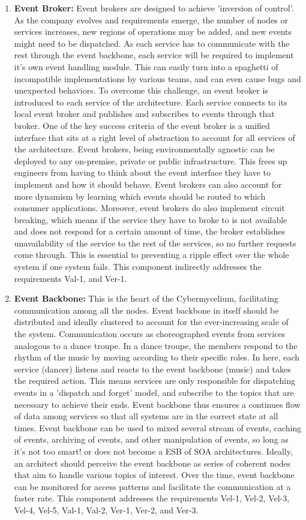 \documentclass[review]{elsarticle}
\begin{document}
\begin{enumerate}
    \item \textbf{Event Broker:} Event brokers are designed to achieve 'inversion of control'. As the company evolves and requirements emerge, the number of nodes or services increases, new regions of operations may be added, and new events might need to be dispatched. As each service has to communicate with the rest through the event backbone, each service will be required to implement it's own event handling module. This can easily turn into a spaghetti of incompatible implementations by various teams, and can even cause bugs and unexpected behaviors. To overcome this challenge, an event broker is introduced to each service of the architecture. Each service connects to its local event broker and publishes and subscribes to events through that broker. One of the key success criteria of the event broker is a unified interface that sits at a right level of abstraction to account for all services of the architecture. Event brokers, being environmentally agnostic can be deployed to any on-premise, private or public infrastructure. This frees up engineers from having to think about the event interface they have to implement and how it should behave. Event brokers can also account for more dynamism by learning which events should be routed to which consumer applications.  Moreover, event brokers do also implement circuit breaking, which means if the service they have to broke to is not available and does not respond for a certain amount of time, the broker establishes unavailability of the service to the rest of the services, so no further requests come through. This is essential to preventing a ripple effect over the whole system if one system fails. This component indirectly addresses the
    requirements Val-1, and Ver-1.
    \item \textbf{Event Backbone:} This is the heart of the Cybermycelium, facilitating communication among all the nodes. Event backbone in itself should be distributed and ideally clustered to account for the ever-increasing scale of the system. Communication occurs as choreographed events from services analogous to a dance troupe. In a dance troupe, the members respond to the rhythm of the music by moving according to their specific roles. In here, each service (dancer) listens and reacts to the event backbone (music) and takes the required action. This means services are only responsible for dispatching events in a 'dispatch and forget' model, and subscribe to the topics that are necessary to achieve their ends. Event backbone thus ensures a continues flow of data among services so that all systems are in the correct state at all times. Event backbone can be used to mixed several stream of events, caching of events, archiving of events, and other manipulation of events, so long as it's not too smart! or does not become a ESB of SOA architectures. Ideally, an architect should perceive the event backbone as series of coherent nodes that aim to handle various topics of interest. Over the time, event backbone can be monitored for access patterns and facilitate the communication at a faster rate. This component addresses the requirements Vel-1, Vel-2, Vel-3, Vel-4, Vel-5, Val-1, Val-2, Ver-1, Ver-2, and Ver-3.

\end{enumerate}
\end{document}
